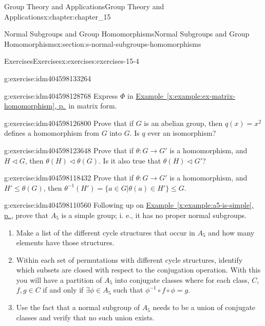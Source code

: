 \documentclass[twoside,10pt,]{book}
\newcommand{\xreffont}{\relax}
\numberwithin{equation}{section}
\begin{document}
\begin{chapterptx}{Group Theory and Applications}{}{Group Theory and Applications}{}{}{x:chapter:chapter_15}
\begin{sectionptx}{Normal Subgroups and Group Homomorphisms}{}{Normal Subgroups and Group Homomorphisms}{}{}{x:section:s-normal-subgroups-homomorphisms}
\begin{exercises-subsection}{Exercises}{}{Exercises}{}{}{x:exercises:exercises-15-4}
\begin{divisionexercise}{5}{}{}{g:exercise:idm404598133264}
\end{divisionexercise}%
\begin{divisionexercise}{6}{}{}{g:exercise:idm404598128768}%
Express \(\Phi\) in \hyperref[x:example:ex-matrix-homomorphism]{Example~{\xreffont\ref{x:example:ex-matrix-homomorphism}}, p.\,\pageref{x:example:ex-matrix-homomorphism}} in matrix form.%
\end{divisionexercise}%
\begin{divisionexercise}{7}{}{}{g:exercise:idm404598126800}%
Prove that if \(G\) is an abelian group, then \(q(x) = x^2\) defines a homomorphism from \(G\) into \(G\).  Is \(q\) ever an isomorphism?%
\end{divisionexercise}%
\begin{divisionexercise}{8}{}{}{g:exercise:idm404598123648}%
Prove that if \(\theta : G\rightarrow G'\) is a homomorphism, and \(H\triangleleft G\), then \(\theta(H) \triangleleft  \theta(G)\). Is it also true that \(\theta(H) \triangleleft  G'\)?%
\end{divisionexercise}%
\begin{divisionexercise}{9}{}{}{g:exercise:idm404598118432}%
Prove that if \(\theta : G \rightarrow  G'\) is a homomorphism, and \(H' \leq  \theta(G)\), then \(\theta^{-1}(H') =\{a\in G| \theta
(a)\in H'\}\leq  G\).%
\end{divisionexercise}%
\begin{divisionexercise}{10}{}{}{g:exercise:idm404598110560}%
Following up on \hyperref[x:example:a5-is-simple]{Example~{\xreffont\ref{x:example:a5-is-simple}}, p.\,\pageref{x:example:a5-is-simple}},  prove that \(A_5\) is a simple group; i. e., it has no proper normal subgroups.%
\begin{enumerate}[label=(\alph*)]
\item{}Make a list of  the different cycle structures that occur in \(A_5\) and how many elements have those structures.%
\item{}Within each set of permutations with different cycle structures, identify which subsets are closed with respect to the conjugation operation. With this you will have a partition of \(A_5\) into conjugate classes where for each class, \(C\), \(f, g\in  C\)   if and only if   \(\exists  \phi  \in A_5\)  such that  \(\phi ^{-1}\circ f\circ  \phi  = g\).%
\item{}Use the fact that a normal subgroup of \(A_5\) needs to be a union of conjugate classes and verify that no such union exists.%
\end{enumerate}
%
\end{divisionexercise}%

\end{exercises-subsection}
\end{sectionptx}
\end{chapterptx}
\end{document}
